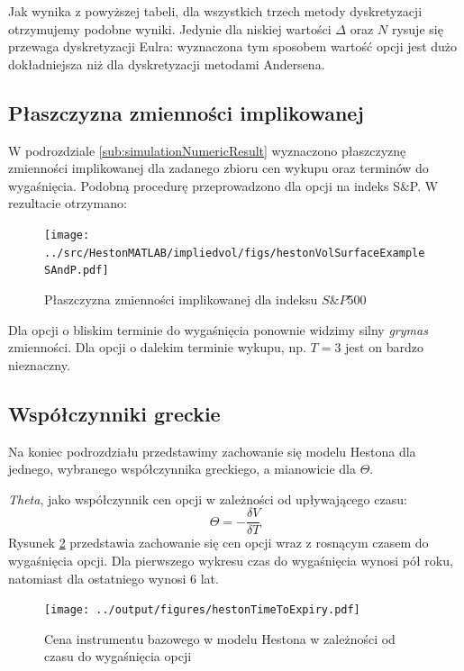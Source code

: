 \documentclass{pracamgr}
\begin{document}
Jak wynika z powyższej tabeli, dla wszystkich trzech metody dyskretyzacji 
otrzymujemy podobne wyniki. Jedynie dla niskiej wartości $\Delta$ oraz $N$ rysuje się 
przewaga dyskretyzacji Eulra: wyznaczona tym sposobem wartość opcji jest dużo
dokładniejsza niż dla dyskretyzacji metodami Andersena.



\subsection{Płaszczyzna zmienności implikowanej}

W podrozdziale \ref{sub:simulationNumericResult} wyznaczono płaszczyznę
zmienności implikowanej dla zadanego zbioru cen wykupu oraz terminów do wygaśnięcia. 
Podobną procedurę przeprowadzono dla opcji na indeks
S\&P. W rezultacie otrzymano:

\begin{figure}[ht!]
  \centering
  \texttt{[image: ../src/HestonMATLAB/impliedvol/figs/hestonVolSurfaceExampleSAndP.pdf]}
  \caption{Płaszczyzna zmienności implikowanej dla indeksu $S\&P$500}
  \label{fig:volatilitySurface}
\end{figure}
Dla opcji o bliskim terminie do wygaśnięcia ponownie widzimy silny \textit{grymas} 
zmienności. Dla opcji o dalekim terminie wykupu, np. $T=3$ jest on 
bardzo nieznaczny.

\subsection{Współczynniki greckie}

Na koniec podrozdziału przedstawimy zachowanie się modelu Hestona dla jednego, wybranego współczynnika 
greckiego, a mianowicie dla $\Theta$.

\textit{Theta}, jako współczynnik cen opcji w zależności od upływającego czasu:
\begin{equation}
  \Theta = - \frac{\delta V}{\delta T}
\end{equation}
Rysunek \ref{fig:hestonTimeToExpiry} przedstawia zachowanie się cen opcji wraz z rosnącym czasem do 
wygaśnięcia opcji. Dla pierwszego wykresu czas do wygaśnięcia wynosi pół roku, natomiast dla 
ostatniego wynosi 6 lat. 

\begin{figure}[ht!]
  \texttt{[image: ../output/figures/hestonTimeToExpiry.pdf]}
  \caption{Cena instrumentu bazowego w modelu Hestona w zależności od czasu do wygaśnięcia opcji}
  \label{fig:hestonTimeToExpiry}
\end{figure}
\end{document}
